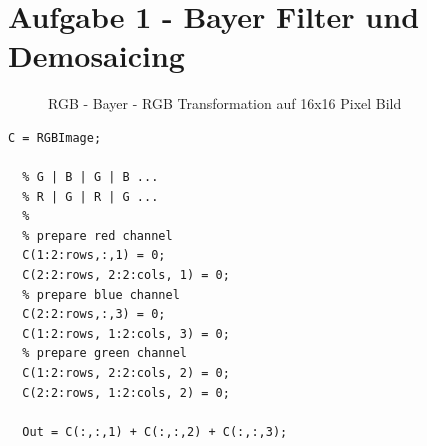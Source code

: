 




\newcommand{\nr}{1}


\section*{Aufgabe 1 - Bayer Filter und Demosaicing}

\begin{figure}[htpb]
\begin{center}
\end{center}
\caption{RGB - Bayer - RGB Transformation auf 16x16 Pixel Bild}
\label{fig:u01t1-debug}
\end{figure}

\lstset{language=matlab}
\begin{lstlisting}[caption={Bayer Transformation}]
  C = RGBImage;
  
  % G | B | G | B ...
  % R | G | R | G ...
  %
  % prepare red channel
  C(1:2:rows,:,1) = 0;
  C(2:2:rows, 2:2:cols, 1) = 0;
  % prepare blue channel
  C(2:2:rows,:,3) = 0;
  C(1:2:rows, 1:2:cols, 3) = 0;
  % prepare green channel
  C(1:2:rows, 2:2:cols, 2) = 0;
  C(2:2:rows, 1:2:cols, 2) = 0;

  Out = C(:,:,1) + C(:,:,2) + C(:,:,3);
\end{lstlisting}

